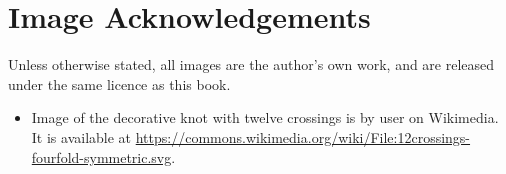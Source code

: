 \chapter{Image Acknowledgements}
Unless otherwise stated, all images are the author's own work, and are released under the same licence as this book.

\begin{itemize}
    \item Image of the decorative knot with twelve crossings is by user  on Wikimedia. It is available at \url{https://commons.wikimedia.org/wiki/File:12crossings-fourfold-symmetric.svg}.
\end{itemize}
